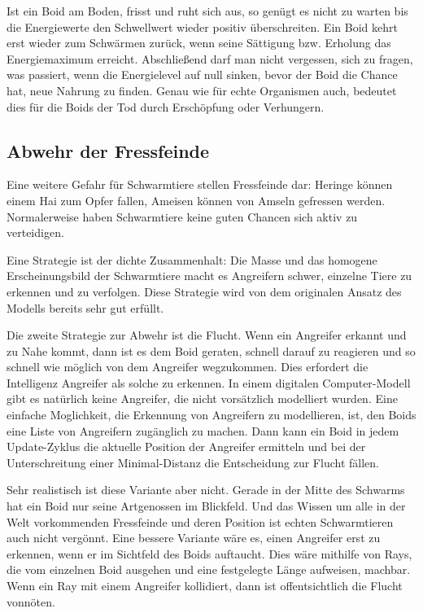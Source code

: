 \documentclass[draft=false
              ,paper=a4
              ,twoside=false
              ,fontsize=11pt
              ,headsepline
              ,BCOR10mm
              ,DIV11
              ,bibtotoc
              ,liststotoc
              ]{scrbook}
\begin{document}
Ist ein Boid am Boden, frisst und ruht sich aus, so genügt es nicht zu warten bis die Energiewerte den Schwellwert wieder positiv überschreiten. Ein Boid kehrt erst wieder zum Schwärmen zurück, wenn seine Sättigung bzw. Erholung das Energiemaximum erreicht.
Abschließend darf man nicht vergessen, sich zu fragen, was passiert, wenn die Energielevel auf null sinken, bevor der Boid die Chance hat, neue Nahrung zu finden. Genau wie für echte Organismen auch, bedeutet dies für die Boids der Tod durch Erschöpfung oder Verhungern.
\subsection{Abwehr der Fressfeinde}\label{enemy}
Eine weitere Gefahr für Schwarmtiere stellen Fressfeinde dar: Heringe können einem Hai zum Opfer fallen, Ameisen können von Amseln gefressen werden. Normalerweise haben Schwarmtiere keine guten Chancen sich aktiv zu verteidigen.

Eine Strategie ist der dichte Zusammenhalt: Die Masse und das homogene Erscheinungsbild der Schwarmtiere macht es Angreifern schwer, einzelne Tiere zu erkennen und zu verfolgen. Diese Strategie wird von dem originalen Ansatz des Modells bereits sehr gut erfüllt.

Die zweite Strategie zur Abwehr ist die Flucht. Wenn ein Angreifer erkannt und zu Nahe kommt, dann ist es dem Boid geraten, schnell darauf zu reagieren und so schnell wie möglich von dem Angreifer wegzukommen. Dies erfordert die Intelligenz Angreifer als solche zu erkennen. In einem digitalen Computer-Modell gibt es natürlich keine Angreifer, die nicht vorsätzlich modelliert wurden. Eine einfache Moglichkeit, die Erkennung von Angreifern zu modellieren, ist, den Boids eine Liste von Angreifern zugänglich zu machen. Dann kann ein Boid in jedem Update-Zyklus die aktuelle Position der Angreifer ermitteln und bei der Unterschreitung einer Minimal-Distanz die Entscheidung zur Flucht fällen.

Sehr realistisch ist diese Variante aber nicht. Gerade in der Mitte des Schwarms hat ein Boid nur seine Artgenossen im Blickfeld. Und das Wissen um alle in der Welt vorkommenden Fressfeinde und deren Position ist echten Schwarmtieren auch nicht vergönnt.
Eine bessere Variante wäre es, einen Angreifer erst zu erkennen, wenn er im Sichtfeld des Boids auftaucht. Dies wäre mithilfe von Rays, die vom einzelnen Boid ausgehen und eine festgelegte Länge aufweisen, machbar. Wenn ein Ray mit einem Angreifer kollidiert, dann ist offentsichtlich die Flucht vonnöten.
\end{document}
